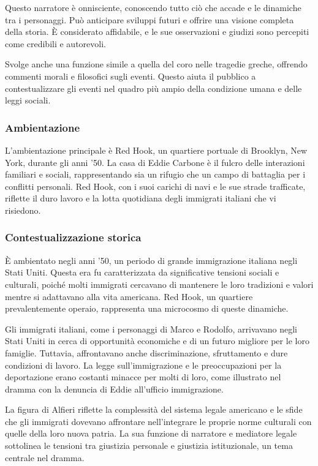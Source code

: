 \documentclass{article}
\begin{document}
Questo narratore è onnisciente, conoscendo tutto ciò che accade e le dinamiche tra i personaggi.
Può anticipare sviluppi futuri e offrire una visione completa della storia. È considerato
affidabile, e le sue osservazioni e giudizi sono percepiti come credibili e autorevoli.

Svolge anche una funzione simile a quella del coro nelle tragedie greche, offrendo commenti
morali e filosofici sugli eventi. Questo aiuta il pubblico a contestualizzare gli eventi nel
quadro più ampio della condizione umana e delle leggi sociali.

\subsubsection{Ambientazione}
L'ambientazione principale è Red Hook, un quartiere portuale di Brooklyn, New York,
durante gli anni '50. La casa di Eddie Carbone è il fulcro delle interazioni familiari e
sociali, rappresentando sia un rifugio che un campo di battaglia per i conflitti personali.
Red Hook, con i suoi carichi di navi e le sue strade trafficate, riflette il duro lavoro e
la lotta quotidiana degli immigrati italiani che vi risiedono.

\subsubsection{Contestualizzazione storica}
È ambientato negli anni '50, un periodo di grande immigrazione italiana negli Stati Uniti.
Questa era fu caratterizzata da significative tensioni sociali e culturali, poiché molti
immigrati cercavano di mantenere le loro tradizioni e valori mentre si adattavano alla vita
americana. Red Hook, un quartiere prevalentemente operaio, rappresenta una microcosmo di queste
dinamiche.

Gli immigrati italiani, come i personaggi di Marco e Rodolfo, arrivavano negli Stati Uniti in
cerca di opportunità economiche e di un futuro migliore per le loro famiglie. Tuttavia,
affrontavano anche discriminazione, sfruttamento e dure condizioni di lavoro. La legge
sull'immigrazione e le preoccupazioni per la deportazione erano costanti minacce per molti
di loro, come illustrato nel dramma con la denuncia di Eddie all'ufficio immigrazione.

La figura di Alfieri riflette la complessità del sistema legale americano e le sfide che gli
immigrati dovevano affrontare nell'integrare le proprie norme culturali con quelle della loro
nuova patria. La sua funzione di narratore e mediatore legale sottolinea le tensioni tra
giustizia personale e giustizia istituzionale, un tema centrale nel dramma.
\end{document}
